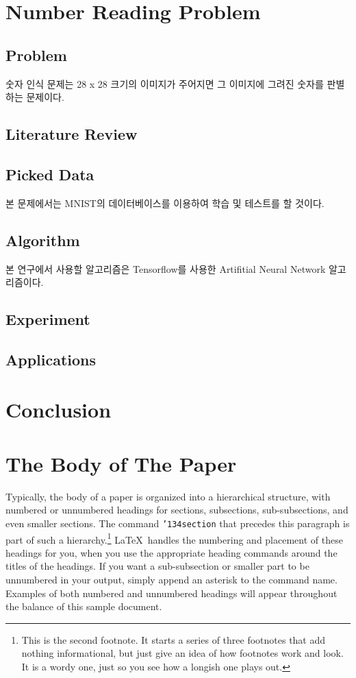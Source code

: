 \documentclass{sig-alternate-05-2015}
\begin{document}
\section{Number Reading Problem}
\begin{CJK}{UTF8}{mj}
\subsection{Problem}
숫자 인식 문제는 28 x 28 크기의 이미지가 주어지면 그 이미지에 그려진 숫자를 판별하는 문제이다.
\subsection{Literature Review}
\subsection{Picked Data}
본 문제에서는 MNIST의 데이터베이스를 이용하여 학습 및 테스트를 할 것이다.
\subsection{Algorithm}
본 연구에서 사용할 알고리즘은 Tensorflow를 사용한 Artifitial Neural Network 알고리즘이다.
\subsection{Experiment}
\subsection{Applications}
\end{CJK}

\section{Conclusion}
\begin{CJK}{UTF8}{mj}
\end{CJK}

\newpage
\appendix
\section{The {\secit Body} of The Paper}
Typically, the body of a paper is organized
into a hierarchical structure, with numbered or unnumbered
headings for sections, subsections, sub-subsections, and even
smaller sections.  The command \texttt{{\char'134}section} that
precedes this paragraph is part of such a
hierarchy.\footnote{This is the second footnote.  It
starts a series of three footnotes that add nothing
informational, but just give an idea of how footnotes work
and look. It is a wordy one, just so you see
how a longish one plays out.} \LaTeX\ handles the numbering
and placement of these headings for you, when you use
the appropriate heading commands around the titles
of the headings.  If you want a sub-subsection or
smaller part to be unnumbered in your output, simply append an
asterisk to the command name.  Examples of both
numbered and unnumbered headings will appear throughout the
balance of this sample document.
\end{document}
